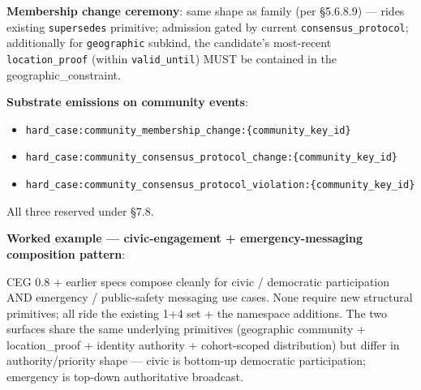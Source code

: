 \documentclass[10pt]{article}
\begin{document}
\textbf{Membership change ceremony}: same shape as family (per §5.6.8.9) — rides existing \texttt{supersedes} primitive; admission gated by current \texttt{consensus\_protocol}; additionally for \texttt{geographic} subkind, the candidate's most-recent \texttt{location\_proof} (within \texttt{valid\_until}) MUST be contained in the geographic\_constraint.


\textbf{Substrate emissions on community events}:

\begin{itemize}\setlength\itemsep{0pt}
\item \texttt{hard\_case:community\_membership\_change:\{community\_key\_id\}}
\item \texttt{hard\_case:community\_consensus\_protocol\_change:\{community\_key\_id\}}
\item \texttt{hard\_case:community\_consensus\_protocol\_violation:\{community\_key\_id\}}
\end{itemize}


All three reserved under §7.8.



\textbf{Worked example — civic-engagement + emergency-messaging composition pattern}:


CEG 0.8 + earlier specs compose cleanly for civic / democratic participation AND emergency / public-safety messaging use cases. None require new structural primitives; all ride the existing 1+4 set + the namespace additions. The two surfaces share the same underlying primitives (geographic community + location\_proof + identity authority + cohort-scoped distribution) but differ in authority/priority shape — civic is bottom-up democratic participation; emergency is top-down authoritative broadcast.
\end{document}
